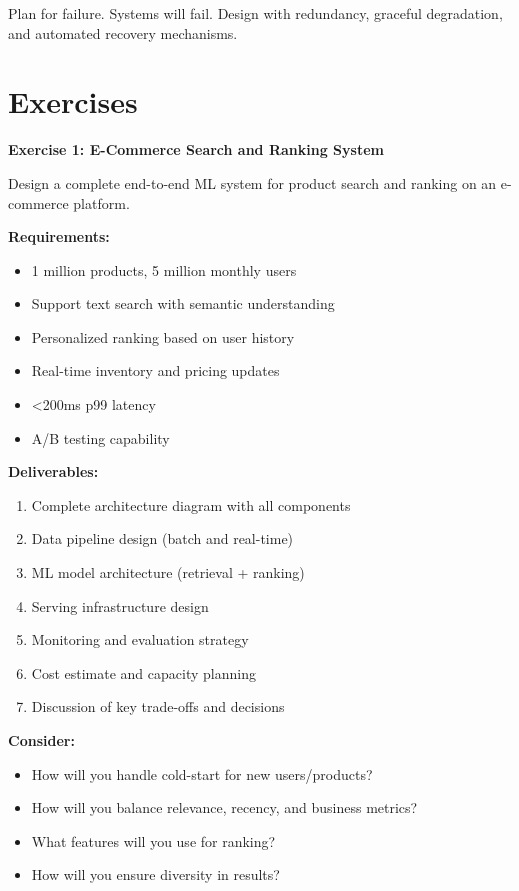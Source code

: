 \begin{bestpractice}
Plan for failure. Systems will fail. Design with redundancy, graceful degradation, and automated recovery mechanisms.
\end{bestpractice}

\section{Exercises}

\begin{exercise}
\textbf{Exercise 1: E-Commerce Search and Ranking System}

Design a complete end-to-end ML system for product search and ranking on an e-commerce platform.

\textbf{Requirements:}
\begin{itemize}
    \item 1 million products, 5 million monthly users
    \item Support text search with semantic understanding
    \item Personalized ranking based on user history
    \item Real-time inventory and pricing updates
    \item <200ms p99 latency
    \item A/B testing capability
\end{itemize}

\textbf{Deliverables:}
\begin{enumerate}
    \item Complete architecture diagram with all components
    \item Data pipeline design (batch and real-time)
    \item ML model architecture (retrieval + ranking)
    \item Serving infrastructure design
    \item Monitoring and evaluation strategy
    \item Cost estimate and capacity planning
    \item Discussion of key trade-offs and decisions
\end{enumerate}

\textbf{Consider:}
\begin{itemize}
    \item How will you handle cold-start for new users/products?
    \item How will you balance relevance, recency, and business metrics?
    \item What features will you use for ranking?
    \item How will you ensure diversity in results?
\end{itemize}
\end{exercise}

